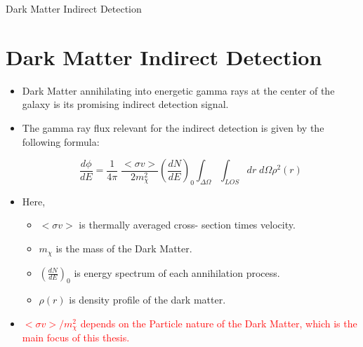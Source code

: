 \documentclass[11pt]{beamer}
\begin{document}
\begin{frame}{Dark Matter Indirect Detection}

\section{Dark Matter Indirect Detection}
\begin{itemize}


\item Dark Matter annihilating into energetic gamma rays at the center of the galaxy is its promising indirect detection signal.

\item The gamma ray flux relevant for the indirect detection is given by the following formula:

\begin{equation*}
\frac{d\phi}{dE} =  \frac{1}{4 \pi}\; \frac{<\sigma v> }{2 m^2_\chi} \left(\frac{dN}{dE}\right)_0 \int_{\Delta\Omega} \int_{LOS} dr\; d\Omega \rho^2(r) \label{indeq}
\end{equation*}


\item Here,
	\begin{itemize}
	\item $<\sigma v> $ is thermally averaged cross-			section times velocity.
	\item $m_\chi$ is the mass of the Dark Matter.
	\item $\left(\frac{dN}{dE}\right)_0$ is energy 			spectrum of each annihilation process.
	\item $\rho(r)$ is density profile of the dark 			matter.
	\end{itemize}

\item \textcolor{red}{ $<\sigma v>/ m^2_\chi$ depends on the Particle nature of the Dark Matter, which is the main focus of this thesis.}

	\end{itemize}

\end{frame}
\end{document}
